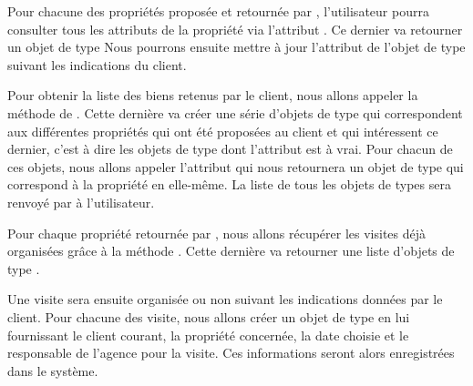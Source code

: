 Pour chacune des propriétés proposée et retournée par , l'utilisateur pourra consulter tous les attributs de la propriété via l'attribut . Ce dernier va retourner un objet de type  Nous pourrons ensuite mettre à jour l'attribut  de l'objet de type  suivant les indications du client.

Pour obtenir la liste des biens retenus par le client, nous allons appeler la méthode  de . Cette dernière va créer une série d'objets de type  qui correspondent aux différentes propriétés qui ont été proposées au client et qui intéressent ce dernier, c'est à dire les objets de type  dont l'attribut  est à vrai. Pour chacun de ces objets, nous allons appeler l'attribut  qui nous retournera un objet de type  qui correspond à la propriété en elle-même. La liste de tous les objets de types  sera renvoyé par  à l'utilisateur.

Pour chaque propriété retournée par , nous allons récupérer les visites déjà organisées grâce à la méthode . Cette dernière va retourner une liste d'objets de type .

Une visite sera ensuite organisée ou non suivant les indications données par le client. Pour chacune des visite, nous allons créer un objet de type  en lui fournissant le client courant, la propriété concernée, la date choisie et le responsable de l'agence pour la visite. Ces informations seront alors enregistrées dans le système.